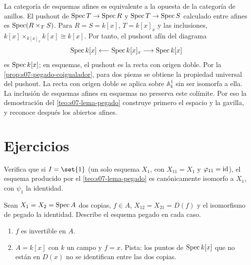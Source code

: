 \begin{obs}
\label{obs:s07-colimite-entre-esquemas-afines}
La categoría de esquemas afines es equivalente a la opuesta de la categoría de anillos. El pushout de $\operatorname{Spec} T\to\operatorname{Spec} R$ y $\operatorname{Spec} T\to\operatorname{Spec} S$ calculado entre afines es $\operatorname{Spec}(R\times_T S)$. Para $R=S=k[x]$, $T=k[x]_x$ y las inclusiones, $k[x]\times_{k[x]_x}k[x]\cong k[x]$. Por tanto, el pushout afín del diagrama
\[
\operatorname{Spec} k[x]\longleftarrow\operatorname{Spec} k[x]_x\longrightarrow\operatorname{Spec} k[x]
\]
es $\operatorname{Spec} k[x]$; en esquemas, el pushout es la recta con origen doble. Por la \cref{prop:s07-pegado-coigualador}, para dos piezas se obtiene la propiedad universal del pushout. La recta con origen doble se aplica sobre $\mathbb A_k^1$ sin ser isomorfa a ella. La inclusión de esquemas afines en esquemas no preserva este colímite. Por eso la demostración del \cref{teo:s07-lema-pegado} construye primero el espacio y la gavilla, y reconoce después los abiertos afines.
\end{obs}

\section{Ejercicios}

\begin{ejer}
\label{ejer:s07-pegado-sola-pieza}
Verifica que si $I=\set{1}$ (un solo esquema $X_1$, con $X_{11}=X_1$ y $\varphi_{11}=\operatorname{id}$), el esquema producido por el \cref{teo:s07-lema-pegado} es canónicamente isomorfo a $X_1$, con $\psi_1$ la identidad.
\end{ejer}

\begin{samepage}
\begin{ejer}
\label{ejer:s07-dos-copias-pegadas-identidad}
Sean $X_1=X_2=\operatorname{Spec} A$ dos copias, $f\in A$, $X_{12}=X_{21}=D(f)$ y el isomorfismo de pegado la identidad. Describe el esquema pegado en cada caso.
\begin{enumerate}
\item $f$ es invertible en $A$.
\item $A=k[x]$ con $k$ un campo y $f=x$. Pista: los puntos de $\operatorname{Spec} k[x]$ que no están en $D(x)$ no se identifican entre las dos copias.
\end{enumerate}
\end{ejer}
\end{samepage}

